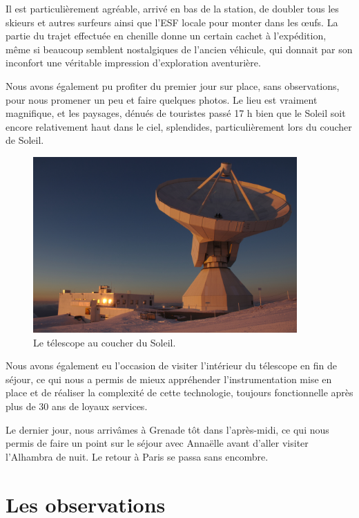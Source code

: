 \documentclass[a4paper,10pt,french]{article}
\begin{document}
Il est particulièrement agréable, arrivé en bas de la station, de doubler tous
les skieurs et autres surfeurs ainsi que l’ESF locale pour monter dans les
œufs. La partie du trajet effectuée en chenille donne un certain cachet à
l’expédition, même si beaucoup semblent nostalgiques de l’ancien véhicule, qui
donnait par son inconfort une véritable impression d’exploration aventurière.

Nous avons également pu profiter du premier jour sur place, sans observations,
pour nous promener un peu et faire quelques photos. Le lieu est vraiment
magnifique, et les paysages, dénués de touristes passé 17 h bien que le Soleil
soit encore relativement haut dans le ciel, splendides, particulièrement lors
du coucher de Soleil.

\begin{figure}[ht]
    \centering
    \includegraphics[width=0.9\textwidth]{30m.jpg}
    \caption{Le télescope au coucher du Soleil.}
\end{figure}

Nous avons également eu l’occasion de visiter l’intérieur du télescope en fin
de séjour, ce qui nous a permis de mieux appréhender l’instrumentation mise en
place et de réaliser la complexité de cette technologie, toujours fonctionnelle
après plus de 30 ans de loyaux services.

Le dernier jour, nous arrivâmes à Grenade tôt dans l'après-midi, ce qui nous permis de faire un point sur le séjour avec Annaëlle avant d'aller visiter l'Alhambra de nuit. Le retour à Paris se passa sans encombre.

\section{Les observations}
\end{document}
